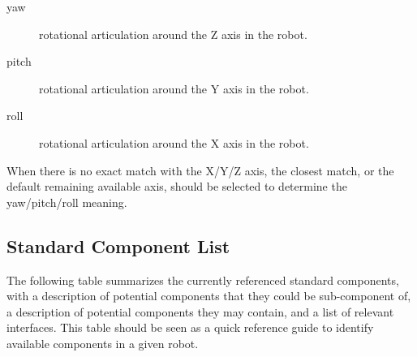 \begin{description}
\item[yaw] rotational articulation around the Z axis in the robot.
\item[pitch] rotational articulation around the Y axis in the robot.
\item[roll] rotational articulation around the X axis in the robot.
\end{description}

When there is no exact match with the X/Y/Z axis, the closest match, or
the default remaining available axis, should be selected to determine
the yaw/pitch/roll meaning.

\subsection{Standard Component List}
\label{sec:naming:components}

The following table summarizes the currently referenced standard
components, with a description of potential components that they could
be sub-component of, a description of potential components they may
contain, and a list of relevant interfaces. This table should be seen as a
quick reference guide to identify available components in a given
robot.

\newcommand{\component}[5]
{
  \lstindex{#1} &
  #5 &
  \code{#2} &
  \code{#3} &
  \code{#4}\\\hline
}

